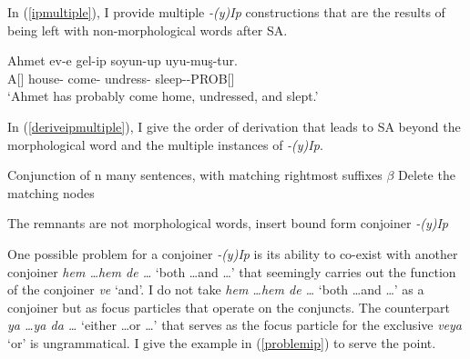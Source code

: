 In (\ref{ipmultiple}), I provide multiple \textit{-(y)Ip} constructions that are the results of being left with non-morphological words after SA.

\begin{exe}
\ex \label{ipmultiple}
\gll Ahmet ev-e gel-ip soyun-up uyu-muş-tur. \\
A[{\Nom}] house-{\Dat} come-{\Pc} undress-{\Pc} sleep-{\Prf}-PROB[{\Tsg}] \\
\glt `Ahmet has probably come home, undressed, and slept.'
\end{exe}

In (\ref{deriveipmultiple}), I give the order of derivation that leads to SA beyond the morphological word and the multiple instances of \textit{-(y)Ip}.

\begin{exe}
\ex \label{deriveipmultiple}
\begin{xlisti}
\ex Conjunction of n many sentences, with matching rightmost suffixes $\beta$
\ex Delete the matching nodes\\
\ex The remnants are not morphological words, insert bound form conjoiner \textit{-(y)Ip}\\
\end{xlisti}
\end{exe}


One possible problem for a conjoiner \textit{-(y)Ip} is its ability to co-exist with another conjoiner \textit{hem \ldots hem de \ldots} `both \ldots and \ldots' that seemingly carries out the function of the conjoiner \textit{ve} `and'. I do not take \textit{hem \ldots hem de \ldots} `both \ldots and \ldots' as a conjoiner but as focus particles that operate on the conjuncts. The counterpart \textit{ya \ldots ya da \ldots} `either \ldots or \ldots' that serves as the focus particle for the exclusive \textit{veya} `or' is ungrammatical. I give the example in (\ref{problemip}) to serve the point.

